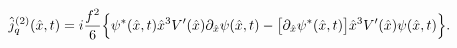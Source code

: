 \begin{equation}
\label{Eq:jq-hat}
\hat j^{(2)}_q(\hat x, t)=i\frac{f^2}{6}
\Bigl \{\psi^{*}(\hat x,t) \hat x^3 V'(\hat x) \partial_{\hat x}
 \psi(\hat x,t)
-\bigl [ \partial_{\hat x} \psi^{*}(\hat x,t) \bigr ]
 \hat x^3 V'(\hat x)\psi(\hat x,t) \Bigr \} .
\end{equation}

